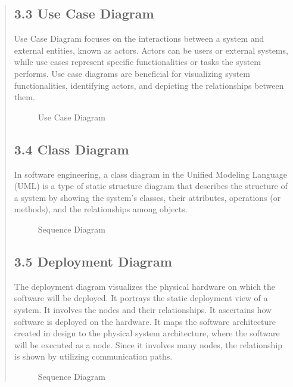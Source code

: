 \documentclass[12pt]{report}
\begin{document}
\begin{quote}
		\subsection{3.3 Use Case Diagram}
		\hspace{1cm}Use Case Diagram focuses on the interactions between a system and external entities, known as actors. Actors can be users or external systems, while use cases represent specific functionalities or tasks the system performs. Use case diagrams are beneficial for visualizing system functionalities, identifying actors, and depicting the relationships between them.
		\begin{figure}
			\centering
			\caption{Use Case Diagram}
		\end{figure}
		\clearpage
		\subsection{3.4 Class Diagram}
		\hspace{1cm}In software engineering, a class diagram in the Unified Modeling Language (UML) is a type of static structure diagram that describes the structure of a system by showing the system's classes, their attributes, operations (or methods), and the relationships among objects.
		\begin{figure}
			\centering
			\caption{Sequence Diagram}
		\end{figure}
		\subsection{3.5 Deployment Diagram}
		\hspace{1cm}The deployment diagram visualizes the physical hardware on which the software will be deployed. It portrays the static deployment view of a system. It involves the nodes and their relationships.
		It ascertains how software is deployed on the hardware. It maps the software architecture created in design to the physical system architecture, where the software will be executed as a node. Since it involves many nodes, the relationship is shown by utilizing communication paths.
		\begin{figure}
			\centering
			\caption{Sequence Diagram}
		\end{figure}
	\end{quote}
	\clearpage
	
\end{document}
